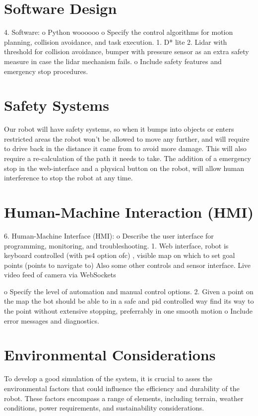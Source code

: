 \documentclass[a4paper]{article}
\begin{document}
\section*{Software Design}
4.	Software:
o	Python woooooo
o	Specify the control algorithms for motion planning, collision avoidance, and task execution.
1.	D* lite
2.	Lidar with threshold for collision avoidance, bumper with pressure sensor as an extra safety measure in case the lidar mechanism fails.
o	Include safety features and emergency stop procedures.

\section*{Safety Systems}
Our robot will have safety systems, so when it bumps into objects or enters restricted areas the robot won't be allowed to move any further, and will require to drive back in the distance it came from to avoid more damage. This will also require a re-calculation of the path it needs to take. The addition of a emergency stop in the web-interface and a physical button on the robot, will allow human interference to stop the robot at any time.

\section*{Human-Machine Interaction (HMI)}
6.	Human-Machine Interface (HMI):
o	Describe the user interface for programming, monitoring, and troubleshooting.
1. Web interface, robot is keyboard controlled (with ps4 option ofc) , 		visible map on which to set goal points (points to navigate to)
Also some other controls and sensor interface. Live video feed of 		camera via WebSockets 	

o	Specify the level of automation and manual control options.
2. Given a point on the map the bot should be able to in a safe and pid controlled way find its way to the point without extensive stopping, preferrably in one smooth motion
o	Include error messages and diagnostics.

\section*{Environmental Considerations}
To develop a good simulation of the system, it is crucial to asses the environmental factors that could influence the efficiency and durability of the robot. These factors encompass a range of elements, including terrain, weather conditions, power requirements, and sustainability considerations.
\end{document}
